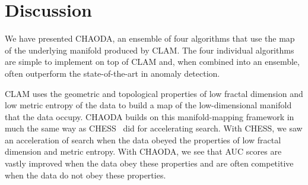\section{Discussion}
\label{sec:discussion}

We have presented CHAODA, an ensemble of four algorithms that use the map of the underlying manifold produced by CLAM.
The four individual algorithms are simple to implement on top of CLAM and, when combined into an ensemble, often outperform the state-of-the-art in anomaly detection.

CLAM uses the geometric and topological properties of low fractal dimension and low metric entropy of the data to build a map of the low-dimensional manifold that the data occupy.
CHAODA builds on this manifold-mapping framework in much the same way as CHESS~\cite{ishaq2019entropy} did for accelerating search.
With CHESS, we saw an acceleration of search when the data obeyed the properties of low fractal dimension and metric entropy.
With CHAODA, we see that AUC scores are vastly improved when the data obey these properties and are often competitive when the data do not obey these properties.




